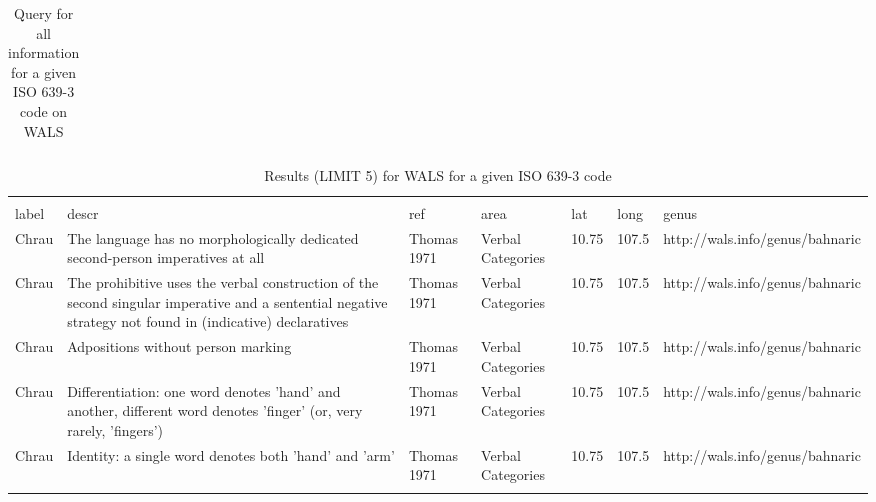 \begin{table*}
\caption{Query for all information for a given ISO 639-3 code on WALS} \label{t1}
\begin{tabular}{lll}
\hline
{\footnotesize } \\
\hline
\end{tabular}
\end{table*}


\begin{table*}
\caption{Results (LIMIT 5) for WALS for a given ISO 639-3 code} \label{t1}
\begin{tabular}{p{.5cm}p{4cm}p{2cm}p{2cm}p{.5cm}p{.5cm}p{3.5cm}}
\hline
& & & & & & \\
label & descr &ref & area & lat & long &genus \\
Chrau & The language has no morphologically dedicated second-person imperatives at all&Thomas 1971 & Verbal Categories&10.75&107.5&http://wals.info/genus/bahnaric\\
Chrau &The prohibitive uses the verbal construction of the second singular imperative and a sentential negative strategy not found in (indicative) declaratives&Thomas 1971&Verbal Categories&10.75&107.5&http://wals.info/genus/bahnaric \\
Chrau&Adpositions without person marking&Thomas 1971&Verbal Categories&10.75&107.5&http://wals.info/genus/bahnaric \\
Chrau&Differentiation: one word denotes 'hand' and another, different word denotes 'finger' (or, very rarely, 'fingers')&Thomas 1971&Verbal Categories&10.75&107.5&http://wals.info/genus/bahnaric \\
Chrau&Identity: a single word denotes both 'hand' and 'arm'&Thomas 1971&Verbal Categories&10.75&107.5&http://wals.info/genus/bahnaric \\
& & & & & & \\
\hline
\end{tabular}
\end{table*}



